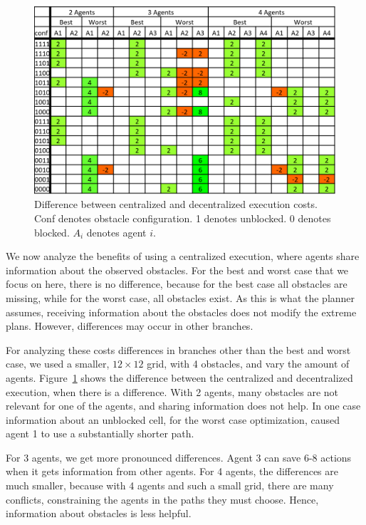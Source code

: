 \documentclass[letterpaper]{article} %
\begin{document}
\begin{figure}[t]
\centering
\includegraphics[scale=.4]{Figures/CostTable.png}
      \caption{Difference between centralized and decentralized execution costs. Conf denotes obstacle configuration. 1 denotes unblocked. 0 denotes blocked. $A_i$ denotes agent $i$.}
      \label{fig:CostTable}
\end{figure}

We now analyze the benefits of using a centralized execution, where agents share information about the observed obstacles. For the best and worst case that we focus on here, there is no difference, because for the best case all obstacles are missing, while for the worst case, all obstacles exist. As this is what the planner assumes, receiving information about the obstacles does not modify the extreme plans. However, differences may occur in other branches.

For analyzing these costs differences in branches other than the best and worst case, we used a smaller, $12\times 12$ grid, with 4 obstacles, and vary the amount of agents. Figure~\ref{fig:CostTable} shows the difference between the centralized and decentralized execution, when there is a difference. With 2 agents, many obstacles are not relevant for one of the agents, and sharing information does not help. In one case  information about an unblocked cell, for the worst case optimization, caused agent 1 to use a substantially shorter path.

For 3 agents, we get more pronounced differences. Agent 3 can save 6-8 actions when it gets information from other agents. For 4 agents, the differences are much smaller, because with 4 agents and such a small grid, there are many conflicts, constraining the agents in the paths they must choose. Hence, information about obstacles is less helpful.
\end{document}
